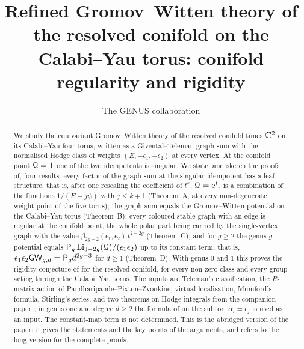 \documentclass[11pt, reqno]{amsart}
\title[Refined GW theory of the resolved conifold on the CY torus (abridged)]{Refined Gromov--Witten theory of the resolved conifold on the Calabi--Yau torus: conifold regularity and rigidity}
\author{The GENUS collaboration}
\begin{document}
\begin{abstract}
We study the equivariant Gromov--Witten theory of the resolved conifold times $\mathbb{C}^2$ on its Calabi--Yau four-torus, written as a Givental--Teleman graph sum with the normalised Hodge class of weights $(E,-\epsilon_1,-\epsilon_2)$ at every vertex. At the conifold point $\mathcal{Q}=1$ one of the two idempotents is singular. We state, and sketch the proofs of, four results: every factor of the graph sum at the singular idempotent has a leaf structure, that is, after one rescaling the coefficient of $t^k$, $\mathcal{Q}=\mathrm{e}^t$, is a combination of the functions $1/(E-j\psi)$ with $j\leq k+1$ (Theorem~A, at every non-degenerate weight point of the five-torus); the graph sum equals the Gromov--Witten potential on the Calabi--Yau torus (Theorem~B); every coloured stable graph with an edge is regular at the conifold point, the whole polar part being carried by the single-vertex graph with the value $\beta_{2g-2}(\epsilon_1,\epsilon_2)\,t^{2-2g}$ (Theorem~C); and for $g\geq2$ the genus-$g$ potential equals $\mathsf{P}_{g}\operatorname{Li}_{3-2g}(\mathcal{Q})/(\epsilon_1\epsilon_2)$ up to its constant term, that is, $\epsilon_1\epsilon_2\mathsf{GW}_{g,d}=\mathsf{P}_{g} d^{2g-3}$ for $d\geq1$ (Theorem~D). With genus $0$ and $1$ this proves the rigidity conjecture of \cite{BS} for the resolved conifold, for every non-zero class and every group acting through the Calabi--Yau torus. The inputs are Teleman's classification, the $R$-matrix action of Pandharipande--Pixton--Zvonkine, virtual localisation, Mumford's formula, Stirling's series, and two theorems on Hodge integrals from the companion paper \cite{LP2}; in genus one and degree $d\geq2$ the formula of \cite{BS} on the subtori $\alpha_i=\epsilon_j$ is used as an input. The constant-map term is not determined. This is the abridged version of the paper: it gives the statements and the key points of the arguments, and refers to the long version for the complete proofs.
\end{abstract}

\maketitle
\genusdisclaimer

\setcounter{tocdepth}{1}
\tableofcontents














\end{document}
